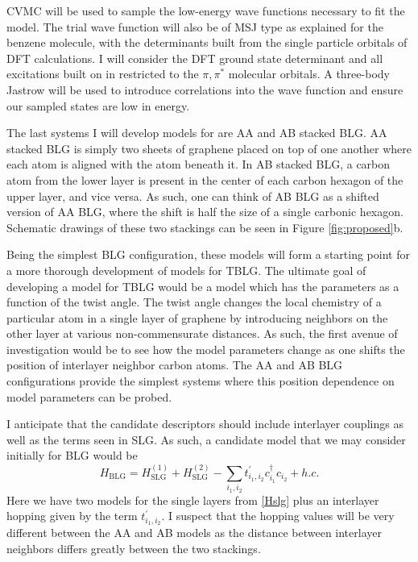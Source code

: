 \documentclass[12pt]{article}
\begin{document}
CVMC will be used to sample the low-energy wave functions necessary to fit the model.
The trial wave function will also be of MSJ type as explained for the benzene molecule, with the determinants built from the single particle orbitals of DFT calculations.
I will consider the DFT ground state determinant and all excitations built on in restricted to the $\pi, \pi^*$ molecular orbitals.
A three-body Jastrow will be used to introduce correlations into the wave function and ensure our sampled states are low in energy.

The last systems I will develop models for are AA and AB stacked BLG.
AA stacked BLG is simply two sheets of graphene placed on top of one another where each atom is aligned with the atom beneath it.
In AB stacked BLG, a carbon atom from the lower layer is present in the center of each carbon hexagon of the upper layer, and vice versa.
As such, one can think of AB BLG as a shifted version of AA BLG, where the shift is half the size of a single carbonic hexagon.
Schematic drawings of these two stackings can be seen in Figure \ref{fig:proposed}b.

Being the simplest BLG configuration, these models will form a starting point for a more thorough development of models for TBLG.
The ultimate goal of developing a model for TBLG would be a model which has the parameters as a function of the twist angle.
The twist angle changes the local chemistry of a particular atom in a single layer of graphene by introducing neighbors on the other layer at various non-commensurate distances.
As such, the first avenue of investigation would be to see how the model parameters change as one shifts the position of interlayer neighbor carbon atoms. 
The AA and AB BLG configurations provide the simplest systems where this position dependence on model parameters can be probed.

I anticipate that the candidate descriptors should include interlayer couplings as well as the terms seen in SLG.
As such, a candidate model that we may consider initially for BLG would be
\begin{equation}
H_\text{BLG} = H_\text{SLG}^{(1)} + H_\text{SLG}^{(2)} - \sum_{i_1, i_2} t_{i_1, i_2}^\prime c_{i_1}^\dagger c_{i_2} + h.c.
\label{Hblg}
\end{equation}
Here we have two models for the single layers from \eqref{Hslg} plus an interlayer hopping given by the term $t_{i_1, i_2}^\prime.$
I suspect that the hopping values will be very different between the AA and AB models as the distance between interlayer neighbors differs greatly between the two stackings.
\end{document}
